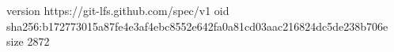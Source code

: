 version https://git-lfs.github.com/spec/v1
oid sha256:b172773015a87fe4e3af4ebc8552e642fa0a81cd03aac216824dc5de238b706e
size 2872
